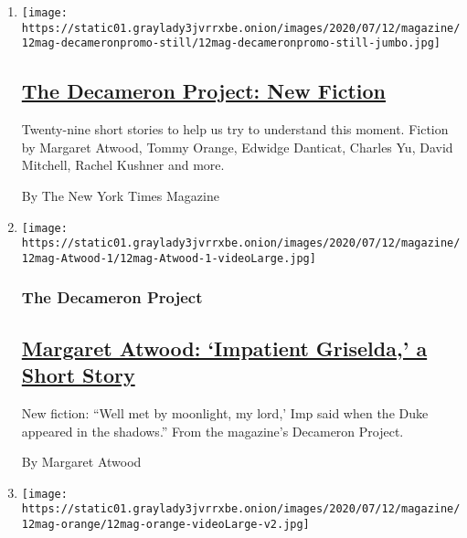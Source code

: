 \begin{enumerate}
\def\labelenumi{\arabic{enumi}.}
\item
  \texttt{[image: https://static01.graylady3jvrrxbe.onion/images/2020/07/12/magazine/12mag-decameronpromo-still/12mag-decameronpromo-still-jumbo.jpg]}

  \hypertarget{the-decameron-project-new-fiction}{%
  \subsection{\texorpdfstring{\href{/interactive/2020/07/07/magazine/decameron-project-short-story-collection.html}{The
  Decameron Project: New
  Fiction}}{The Decameron Project: New Fiction}}\label{the-decameron-project-new-fiction}}

  Twenty-nine short stories to help us try to understand this moment.
  Fiction by Margaret Atwood, Tommy Orange, Edwidge Danticat, Charles
  Yu, David Mitchell, Rachel Kushner and more.

  By The New York Times Magazine
\item
  \texttt{[image: https://static01.graylady3jvrrxbe.onion/images/2020/07/12/magazine/12mag-Atwood-1/12mag-Atwood-1-videoLarge.jpg]}

  \hypertarget{the-decameron-project}{%
  \subsubsection{The Decameron Project}\label{the-decameron-project}}

  \hypertarget{margaret-atwood-impatient-griselda-a-short-story}{%
  \subsection{\texorpdfstring{\href{/interactive/2020/07/07/magazine/margaret-atwood-short-story.html}{Margaret
  Atwood: `Impatient Griselda,' a Short
  Story}}{Margaret Atwood: `Impatient Griselda,' a Short Story}}\label{margaret-atwood-impatient-griselda-a-short-story}}

  New fiction: ``Well met by moonlight, my lord,' Imp said when the Duke
  appeared in the shadows.'' From the magazine's Decameron Project.

  By Margaret Atwood
\item
  \texttt{[image: https://static01.graylady3jvrrxbe.onion/images/2020/07/12/magazine/12mag-orange/12mag-orange-videoLarge-v2.jpg]}

  \hypertarget{the-decameron-project-1}{%
}
\end{enumerate}
